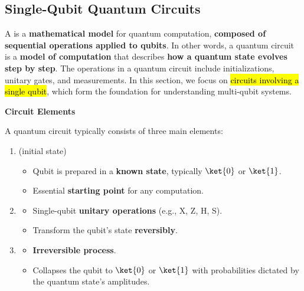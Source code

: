 \subsection{Single-Qubit Quantum Circuits}

A  is a \textbf{mathematical model} for quantum computation, \textbf{composed of sequential operations applied to qubits}. In other words, a quantum circuit is a \textbf{model of computation} that describes \textbf{how a quantum state evolves step by step}. The operations in a quantum circuit include initializations, unitary gates, and measurements. In this section, we focus on \hl{circuits involving a single qubit}, which form the foundation for understanding multi-qubit systems.

\highspace
\begin{flushleft}
    \textcolor{Green3}{ \textbf{Circuit Elements}}
\end{flushleft}
A quantum circuit typically consists of three main elements:
\begin{enumerate}
    \item {} (initial state)
    \begin{itemize}
        \item Qubit is prepared in a \textbf{known state}, typically $\ket{0}$ or $\ket{1}$.
        \item Essential \textbf{starting point} for any computation.
    \end{itemize}

    \item {}
    \begin{itemize}
        \item Single-qubit \textbf{unitary operations} (e.g., X, Z, H, S).
        \item Transform the qubit's state \textbf{reversibly}.
    \end{itemize}

    \item {}
    \begin{itemize}
        \item \textbf{Irreversible process}.
        \item Collapses the qubit to $\ket{0}$ or $\ket{1}$ with probabilities dictated by the quantum state's amplitudes.
    \end{itemize}
\end{enumerate}

